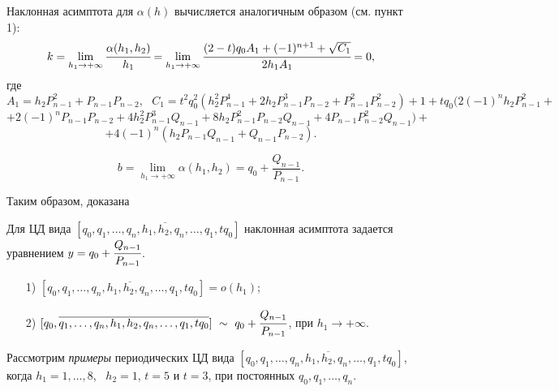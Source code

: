 Наклонная асимптота для $\alpha(h)$ вычисляется аналогичным образом (см. пункт 1):
\[k=\lim_{{h_1}\to +\infty}\cfrac {\alpha(h_1,h_2)}{h_1}=\lim_{{h_1}\to +\infty}\cfrac {(2-t){q_0}{A_1}+(-1)^{n+1}+\sqrt{C_1}}{2{h_1}{A_1}}=0,\]
где
\small \[A_1={h_2}{P^{2}_{n-1}}+{P_{n-1}}{P_{n-2}}, \ \ \ C_1=t^{2}{{q}^{2}_0}({{h}^{2}_2}{P^{4}_{n-1}}+2{h_2}{P^{3}_{n-1}}{P_{n-2}}+{P^{2}_{n-1}}{P^{2}_{n-2}})+1+t{q_0}(2(-1)^{n}{h_2}{P^{2}_{n-1}}+\]
\[+2(-1)^{n}{P_{n-1}}{P_{n-2}}+4{h^{2}_2}{P^{3}_{n-1}}{Q_{n-1}}+8{h_2}{P^{2}_{n-1}}{P_{n-2}}{Q_{n-1}}+4{P_{n-1}}{P^{2}_{n-2}}{Q_{n-1}})+\]
\[+4(-1)^{n}({h_2}{P_{n-1}}{Q_{n-1}}+{Q_{n-1}}{P_{n-2}}).\]
\normalsize

\[b=\lim_{{h_1}\to +\infty}\alpha(h_1,h_2)={q_0}+\frac {Q_{n-1}}{P_{n-1}}.\]

Таким образом, доказана
\begin{theoremr}\label{PiskunovaTretyakov:th:7}
Для ЦД вида $[{q_0},\overline{{q_1},\dots,{q_n},{h_{1}},{h_{2}},{q_n},\dots,{q_1},t{q_0}}]$ наклонная асимптота задается уравнением $y={q_0}+\cfrac {Q_{n-1}}{P_{n-1}}$.
\end{theoremr}

\begin{corollaryr}
\begin{enumerate}
\item[1) ]$[{q_0},\overline{{q_1},\dots,{q_n},{h_{1}},{h_{2}},{q_n},\dots,{q_1},t{q_0}}]=o(h_{1})$;
\item[2) ]$[{q_0},\overline{{q_1},\dots,{q_n},{h_{1}},{h_{2}},{q_n},\dots,{q_1},t{q_0}}] \ \sim \ {{q_0}+\cfrac {Q_{n-1}}{P_{n-1}}}$, при ${{h_{1}}\to +\infty}$.
\end{enumerate}
\end{corollaryr}


Рассмотрим \emph{примеры} периодических ЦД вида $[{q_0},\overline{{q_1},\dots,{q_n},{h_1},{h_2},{q_n},\dots,{q_1},{t{q_0}}}]$,
когда $h_1=1,\dots,8$, \ ${h_2}=1$, $t=5$ и $t=3$, при постоянных ${q_0},{q_1},\dots,{q_n}.$

